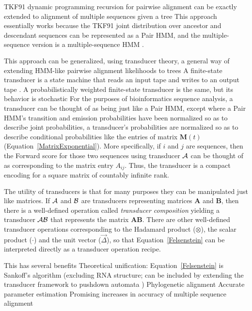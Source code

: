 \documentclass{bmcart}
\newcommand{\matr}[1]{\mathbf{#1}}
\newcommand{\trans}[1]{{\cal #1}}
\newcommand{\eqref}[1]{Equation~\ref{#1}}
\newcommand{\condmatrix}{\matr{M}}
\newcommand{\unitvec}{\vec{\Delta}}
\newcommand{\pointprod}{\otimes}
\newcommand{\scalarprod}{\cdot}
\begin{document}
TKF91 dynamic programming recursion for pairwise alignment can be exactly extended to alignment of multiple sequences given a tree \cite{Hein2001,LunterSongMiklosHein2003}
This approach essentially works because the TKF91 joint distribution over ancestor and descendant sequences
can be represented as a Pair HMM,
and the multiple-sequence version is a multiple-sequence HMM \cite{HolmesBruno2001}.

This approach can be generalized, using transducer theory, a general way of extending HMM-like pairwise alignment likelihoods to trees \cite{WestessonEtAl2012,BouchardCote2013,IndelHistorian}
A finite-state transducer is a state machine that reads an input tape and writes to an output tape \cite{Mealy55}.
A probabilistically weighted finite-state transducer is the same, but its behavior is stochastic \cite{MohriPereiraRiley2000}
For the purposes of bioinformatics sequence analysis,
a transducer can be thought of as being just like a Pair HMM,
except where a Pair HMM's transition and emission probabilities
have been normalized so as to describe joint probabilities,
a transducer's probabilities are normalized so as to describe conditional probabilities
like the entries of matrix $\condmatrix(t)$ (\eqref{MatrixExponential}).
More specifically, if $i$ and $j$ are sequences, then the Forward score
for those two sequences using transducer $\trans{A}$
can be thought of as corresponding to the matrix entry $A_{ij}$.
Thus, the transducer is a compact encoding for a square matrix of countably infinite rank.

The utility of transducers is that for many purposes they can be manipulated just like matrices.
If $\trans{A}$ and $\trans{B}$ are transducers representing matrices $\matr{A}$ and $\matr{B}$,
then there is a well-defined operation called {\em transducer composition}
yielding a transducer $\trans{A}\trans{B}$ that represents the matrix $\matr{A}\matr{B}$.
There are other well-defined transducer operations corresponding to the Hadamard product
($\pointprod$), the scalar product ($\scalarprod$) and the unit vector ($\unitvec$),
so that \eqref{Felsenstein} can be interpreted directly
as a transducer operation recipe.

This has several benefits
Theoretical unification: \eqref{Felsenstein} is Sankoff's algorithm \cite{Sankoff85}
(excluding RNA structure; can be included by extending the transducer
framework to pushdown automata \cite{BradleyHolmes2009})
Phylogenetic alignment \cite{RedelingsSuchard2005,RedelingsSuchard2007}
Accurate parameter estimation \cite{WestessonEtAl2012,Redelings2014}
Promising increases in accuracy of multiple sequence alignment \cite{IndelHistorian}
\end{document}
